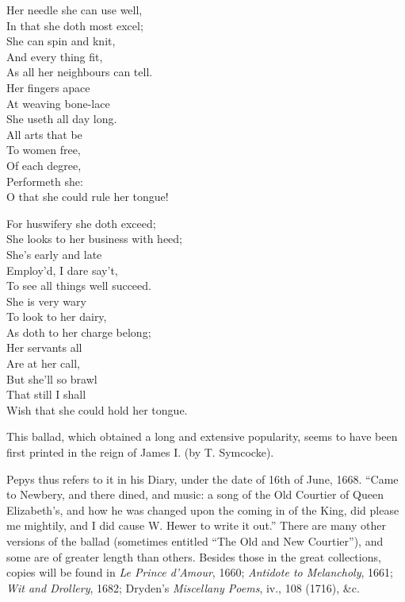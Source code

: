 
\settowidth{\versewidth}{O that she could rule her tongue!}
\begin{dcverse}
\begin{patverse}
Her needle she can use well,\\
In that she doth most excel;\\
She can spin and knit,\\
And every thing fit,\\
As all her neighbours can tell.\\
Her fingers apace\\
At weaving bone-lace\\
She useth all day long.\\
All arts that be\\
To women free,\\
Of each degree,\\
Performeth she:\\
O that she could rule her tongue!
\end{patverse}

\begin{patverse}
For huswifery she doth exceed;\\
She looks to her business with heed;\\
She’s early and late\\
Employ’d, I dare say’t,\\
To see all things well succeed.\\
She is very wary\\
To look to her dairy,\\
As doth to her charge belong;\\
Her servants all\\
Are at her call,\\
But she’ll so brawl\\
That still I shall\\
Wish that she could hold her tongue.
\end{patverse}
\end{dcverse}


This ballad, which obtained a long and extensive popularity, seems to have
been first printed in the reign of James I. (by T. Symcocke).

Pepys thus refers to it in his Diary, under the date of 16th of June, 1668.
“Came to Newbery, and there dined, and music: a song of the Old Courtier of
Queen Elizabeth’s, and how he was changed upon the coming in of the King, did
please me mightily, and I did cause W. Hewer to write it out.” There are many
other versions of the ballad (sometimes entitled “The Old and New Courtier”),
and some are of greater length than others. Besides those in the great collections,
copies will be found in \textit{Le Prince d’Amour}, 1660; \textit{Antidote to Melancholy}, 1661;
\textit{Wit and Drollery}, 1682; Dryden’s \textit{Miscellany Poems}, iv., 108 (1716), \&c.

